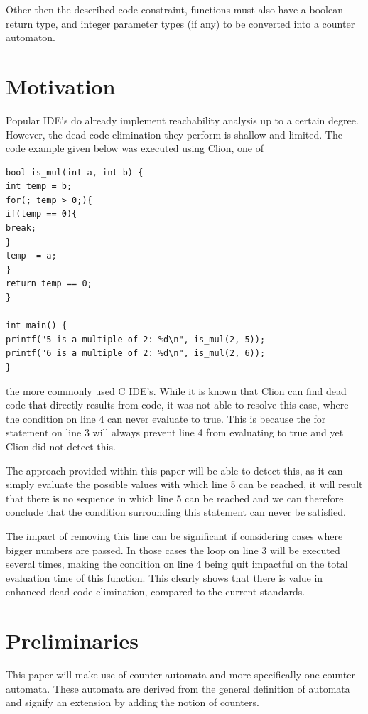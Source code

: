 \documentclass[12pt]{article}
\begin{document}
Other then the described code constraint, functions must also have a boolean return type, and integer parameter types (if any) to be converted into a counter automaton.

\section{Motivation}
Popular IDE's do already implement reachability analysis up to a certain degree. However, the dead code elimination they perform is shallow and limited. The code example given below was executed using Clion, one of 

\begin{lstlisting}[style=CStyle]
bool is_mul(int a, int b) {
int temp = b;
for(; temp > 0;){
if(temp == 0){
break;
}
temp -= a;
}
return temp == 0;
}

int main() {
printf("5 is a multiple of 2: %d\n", is_mul(2, 5));
printf("6 is a multiple of 2: %d\n", is_mul(2, 6));
}
\end{lstlisting}

\noindent
the more commonly used C IDE's. While it is known that Clion can find dead code that directly results from code, it was not able to resolve this case, where the condition on line 4 can never evaluate to true. This is because the for statement on line 3 will always prevent line 4 from evaluating to true and yet Clion did not detect this. 

The approach provided within this paper will be able to detect this, as it can simply evaluate the possible values with which line 5 can be reached, it will result that there is no sequence in which line 5 can be reached and we can therefore conclude that the condition surrounding this statement can never be satisfied.

The impact of removing this line can be significant if considering cases where bigger numbers are passed. In those cases the loop on line 3 will be executed several times, making the condition on line 4 being quit impactful on the total evaluation time of this function. This clearly shows that there is value in enhanced dead code elimination, compared to the current standards. 

\section{Preliminaries}
This paper will make use of counter automata and more specifically one counter automata. These automata are derived from the general definition of automata and signify an extension by adding the notion of counters.
\end{document}
